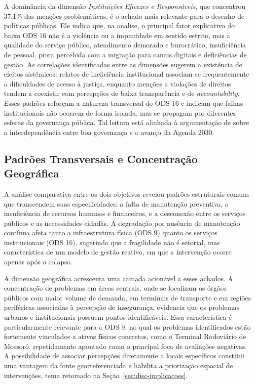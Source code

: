 A dominância da dimensão \textit{Instituições Eficazes e Responsáveis}, que concentrou 37,1\% das menções problemáticas, é o achado mais relevante para o desenho de políticas públicas. Ele indica que, na analise, o principal fator explicativo do baixo ODS 16 não é a violência ou a impunidade em sentido estrito, mas a qualidade do serviço público, atendimento demorado e burocrático, insuficiência de pessoal, piora percebida com a migração para canais digitais e deficiências de gestão. As correlações identificadas entre as dimensões sugerem a existência de efeitos sistêmicos: relatos de ineficiência institucional associam-se frequentemente a dificuldades de acesso à justiça, enquanto menções a violações de direitos tendem a coexistir com percepções de baixa transparência e de \textit{accountability}. Esses padrões reforçam a natureza transversal do ODS 16 e indicam que falhas institucionais não ocorrem de forma isolada, mas se propagam por diferentes esferas da governança pública. Tal leitura está alinhada à argumentação de \citeauthor{massey2022} \citeyear{massey2022} sobre a interdependência entre boa governança e o avanço da Agenda 2030.

\subsection{Padrões Transversais e Concentração Geográfica}
\label{subsec:disc-transversais}

A análise comparativa entre os dois objetivos revelou padrões estruturais comuns que transcendem suas especificidades: a falta de manutenção preventiva, a insuficiência de recursos humanos e financeiros, e a desconexão entre os serviços públicos e as necessidades cidadãs. A degradação por ausência de manutenção contínua afeta tanto a infraestrutura física (ODS 9) quanto os serviços institucionais (ODS 16), sugerindo que a fragilidade não é setorial, mas característica de um modelo de gestão reativo, em que a intervenção ocorre apenas após o colapso.

A dimensão geográfica acrescenta uma camada acionável a esses achados. A concentração de problemas em áreas centrais, onde se localizam os órgãos públicos com maior volume de demanda, em terminais de transporte e em regiões periféricas associadas à percepção de insegurança, evidencia que os problemas urbanos e institucionais possuem pontos identificáveis. Essa característica é particularmente relevante para o ODS 9, no qual os problemas identificados estão fortemente vinculados a ativos físicos concretos, como o Terminal Rodoviário de Mossoró, repetidamente apontado como o principal foco de avaliações negativas. A possibilidade de associar percepções diretamente a locais específicos constitui uma vantagem da fonte georreferenciada e habilita a priorização espacial de intervenções, tema retomado na Seção~\ref{sec:disc-implicacoes}.

